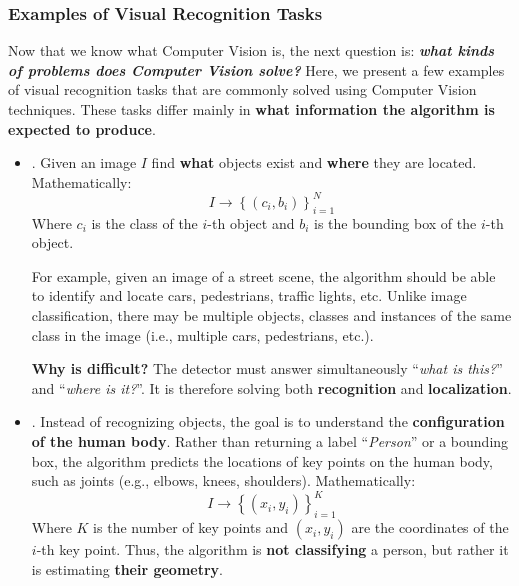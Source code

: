 \subsubsection{Examples of Visual Recognition Tasks}\label{sec:examples-of-visual-recognition-tasks}

Now that we know what Computer Vision is, the next question is: \emph{\textbf{what kinds of problems does Computer Vision solve?}} Here, we present a few examples of visual recognition tasks that are commonly solved using Computer Vision techniques. These tasks differ mainly in \textbf{what information the algorithm is expected to produce}.
\begin{itemize}
    \item {}. Given an image $I$ find \textbf{what} objects exist and \textbf{where} they are located. Mathematically:
    \begin{equation*}
        I \to \left\{
            \left(c_i , b_i\right)
        \right\}_{i=1}^{N}
    \end{equation*}
    Where $c_i$ is the class of the $i$-th object and $b_i$ is the bounding box of the $i$-th object.

    For example, given an image of a street scene, the algorithm should be able to identify and locate cars, pedestrians, traffic lights, etc. Unlike image classification, there may be multiple objects, classes and instances of the same class in the image (i.e., multiple cars, pedestrians, etc.).

    \textcolor{Red2}{ \textbf{Why is difficult?}} The detector must answer simultaneously ``\emph{what is this?}'' and ``\emph{where is it?}''. It is therefore solving both \textbf{recognition} and \textbf{localization}.


    \item {}. Instead of recognizing objects, the goal is to understand the \textbf{configuration of the human body}. Rather than returning a label ``\emph{Person}'' or a bounding box, the algorithm predicts the locations of key points on the human body, such as joints (e.g., elbows, knees, shoulders). Mathematically:
    \begin{equation*}
        I \to \left\{
            \left(x_i, y_i\right)
        \right\}_{i=1}^{K}
    \end{equation*}
    Where $K$ is the number of key points and $(x_i, y_i)$ are the coordinates of the $i$-th key point. Thus, the algorithm is \textbf{not classifying} a person, but rather it is estimating \textbf{their geometry}.



\end{itemize}
